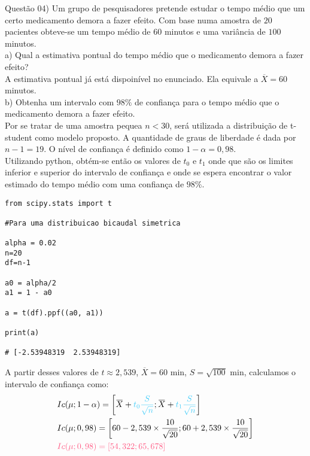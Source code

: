
\noindent \textcolor{COLOR1}{Questão 04)} Um grupo de pesquisadores pretende estudar o tempo médio que um certo medicamento demora a fazer efeito. Com base numa amostra de $20$ pacientes obteve-se um tempo médio de $60$ minutos e uma variância de $100$ minutos.
\\

a) Qual a estimativa pontual do tempo médio que o medicamento demora a fazer efeito?
\\

A estimativa pontual já está dispoinível no enunciado. Ela equivale a \textcolor{COLOR2}{$\overbar{X}=60$ minutos}.
\\

b) Obtenha um intervalo com $98\%$ de confiança para o tempo médio que o medicamento demora a fazer efeito.
\\

Por se tratar de uma amostra pequea $n<30$, será utilizada a distribuição de t-student como modelo proposto. A quantidade de graus de liberdade é dada por $n-1=19$. O nível de confiança é definido como $1-\alpha = 0,98$.\\

Utilizando python, obtém-se então os valores de $t_0$ e $t_1$ onde que são os limites inferior e superior do intervalo de confiança e onde se espera encontrar o valor estimado do tempo médio com uma confiança de $98\%$.\\

\begin{lstlisting}
from scipy.stats import t

#Para uma distribuicao bicaudal simetrica

alpha = 0.02
n=20
df=n-1
    
a0 = alpha/2
a1 = 1 - a0
    
a = t(df).ppf((a0, a1))
    
print(a)
    
# [-2.53948319  2.53948319]
\end{lstlisting}

A partir desses valores de $t\approx2,539$, $\overbar{X}=60$ min, $S=\sqrt{100}$ min, calculamos o intervalo de confiança como:\\

\[
    \begin{split}
        &Ic(\mu; 1-\alpha) = \biggl[\overbar{X}+\textcolor{deepblue}{t_0\frac{S}{\sqrt{n}}};\overbar{X}+\textcolor{deepblue}{t_1\frac{S}{\sqrt{n}}}\biggr]\\
        &Ic(\mu; 0,98) = \biggl[60-2,539\times\frac{10}{\sqrt{20}};60+2,539\times\frac{10}{\sqrt{20}}\biggr]\\
        &\textcolor{COLOR2}{Ic(\mu; 0,98) = [54,322;65,678]}
    \end{split}
\]
\\

